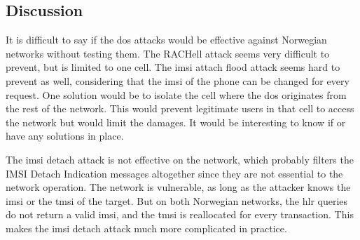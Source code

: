     \iffalse
    NEED TO TEST IMSI DETACH FROM TELENOR TO NETCOM ETC. SEE IF CAN
    DETACH PHONE IN OTHER COUNTRIES AND SO ON.

    The Location Updating Reject can reply either with
    Forbidden PLMN, or IMSI unknown in HLR. I do not know which value of
    the \gls{imsi} triggers the second one, but that's what we want.
    imsi detach as well
    \fi

      \iffalse
     It works well on telenor network but not on netcom's. This
    was tested with the telenor sim, the netcom sim, the proximus sim
    and the base sim. I guess that netcom filter these requests. This
    has a limited effect, as soon as the targeted phone contacts the
    network for any reason, it is removed. So when starting the phone
    again, the text message shows up.

    When starting the phone again, the text shows up.
    \fi

    \subsection{Discussion}

      It is difficult to say if the \gls{dos} attacks would be effective
      against Norwegian networks without testing them. The RACHell
      attack seems very difficult to prevent, but is limited to one
      cell. The \gls{imsi} attach flood attack seems hard to prevent as
      well, considering that the \gls{imsi} of the phone can be changed
      for every request. One solution would be to isolate the cell where
      the \gls{dos} originates from the rest of the network. This would
      prevent legitimate users in that cell to access the network but
      would limit the damages. It would be interesting to know if
       or  have any solutions in
      place.

      The \gls{imsi} detach attack is not effective on the 
      network, which probably filters the IMSI Detach Indication
      messages altogether since they are not essential to the network
      operation. The  network is vulnerable, as long as
      the attacker knows the \gls{imsi} or the \gls{tmsi} of the target.
      But on both Norwegian networks, the \gls{hlr} queries do not
      return a valid \gls{imsi}, and the \gls{tmsi} is reallocated for
      every transaction. This makes the \gls{imsi} detach attack much
      more complicated in practice.
